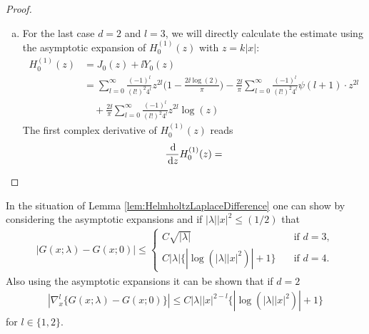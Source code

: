 \begin{proof}
\begin{enumerate}[(a)]
  \item For the last case $d = 2$ and $l = 3$, we will directly calculate the estimate using the asymptotic expansion of $H_0^{(1)}(z)$ with $z = k|x|$:
    \begin{align*}
      H_0^{(1)}(z) 
      &= J_0(z) + \ii Y_0(z) \\
      &= \sum_{l = 0}^\infty \frac{(-1)^l}{(l!)^2 4^l} z^{2l} \big( 1 - \frac{2\ii \log(2)}{\pi} \big) 
      - \frac{2 \ii}{\pi} \sum_{l = 0}^\infty \frac{(-1)^l}{(l!)^2 4^l} \psi(l + 1) \cdot z^{2l} \\
      &\quad + \frac{2\ii}{\pi} \sum_{l = 0}^\infty \frac{(-1)^l}{(l!)^2 4^l} z^{2l} \log(z)
    \end{align*}
    The first complex derivative of $H_0^{(1)}(z)$ reads
    \begin{align*}
      \frac{\, {\operatorname{d}\!{}}}{\, {\operatorname{d}\!{z}}} H_0^{(1)}(z) = 
    \end{align*}

  \end{enumerate}
\end{proof}

\begin{rem}
  In the situation of Lemma \ref{lem:HelmholtzLaplaceDifference} one can show by considering the asymptotic expansions and if $|\lambda| |x|^2 \leq (1/2)$ that 
  \begin{align*}
    |G(x; \lambda) - G(x; 0) | \leq \begin{cases}
      C \sqrt{|\lambda|} \quad&\text{if } d = 3, \\
      C |\lambda| \{ |\log(|\lambda| |x|^2) | + 1 \} \quad&\text{if } d = 4.
    \end{cases}
  \end{align*}
  Also using the asymptotic expansions it can be shown that if $d = 2$
  \begin{align*}
    |\nabla_x^l \{ G(x; \lambda) - G(x; 0) \} | \leq C |\lambda| |x|^{2 - l} \{ |\log(|\lambda| |x|^2 ) | + 1 \}
  \end{align*}
  for $l \in \{1, 2\}$.  
\end{rem}

